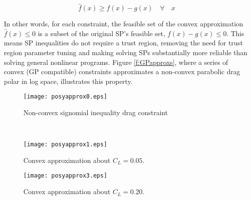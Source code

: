 \begin{equation}
\hat{f}(x) \geq f(x) - g(x) \quad \forall \quad x
\end{equation}

In other words, for each constraint, the feasible set of the convex
approximation $\hat{f}(x) \leq 0$ is a subset of the original SP's feasible set,
$f(x) - g(x) \leq 0$. This means SP inequalities do not require a trust region,
removing the need for trust region parameter tuning and making solving SPs
substantially more reliable than solving general nonlinear programs. Figure
\ref{f:GPapproxs}, where a series of convex (GP compatible) constraints
approximates a non-convex parabolic drag polar in log space, illustrates this
property.

\begin{figure*}[t!]
    \centering
    \begin{subfigure}[t]{0.5\linewidth}
        \centering
        \texttt{[image: posyapprox0.eps]}
        \caption{Non-convex signomial inequality drag constraint}
    \end{subfigure}%
    ~
    \begin{subfigure}[t]{0.5\linewidth}
        \centering
        \texttt{[image: posyapprox1.eps]}
        \caption{Convex approximation about $C_{L} = 0.05$.}
    \end{subfigure}
    \begin{subfigure}[b]{0.5\linewidth}
        \centering
        \texttt{[image: posyapprox3.eps]}
        \caption{Convex approximation about $C_{L} = 0.20.$}
    \end{subfigure}
    \caption{A signomial inequality constraint and GP approximations about two
different points.}
    \label{f:GPapproxs}
\end{figure*}


